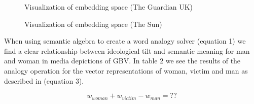 \documentclass{article}
\begin{document}
{{\begin{figure}[H]
	\caption{\label{fig:my-label1} Visualization of embedding space (The Guardian UK)}
\end{figure}

\begin{figure}[H]
	\caption{\label{fig:my-label1} Visualization of embedding space (The Sun)}
\end{figure}


When using semantic algebra to create a word analogy solver (equation 1) we find a clear relationship between ideological tilt and semantic meaning for man and woman in media depictions of GBV. In table 2 we see the results of the analogy operation for the vector representations of woman, victim and man as described in (equation 3).

\begin{equation} \label{eu_eqn}
	w_{woman} + w_{victim} - w_{man} = ??
\end{equation}

}}
\end{document}
